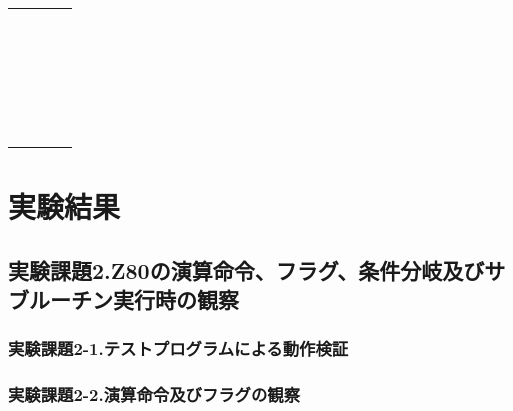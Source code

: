 \documentclass[11pt,a4j]{jsarticle}
\begin{document}
   \begin{table}[htb]
  \begin{center}
    \caption{}
    \begin{tabular}{|llll|} \hline
 &  &  &  \\
 &  &  &  \\
 &  &  &  \\
 &  &  &  \\
 &  &  &  \\
 &  &  &  \\
 &  &  &  \\
 &  &  &  \\
 &  &  &  \\
 &  &  &  \\
 &  &  &  \\
 &  &  &  \\
 &  &  &  \\
 &  &  &  \\
 &  &  &  \\
 &  &  &  \\
 &  &  &  \\
 &  &  &  \\
 &  &  &  \\
 &  &  &  \\
 &  &  &  \\
 &  &  &  \\
 &  &  &  \\ \hline
    \end{tabular}
    \label{}
  \end{center}
 \end{table}
   
  
  
  
 \section{実験結果}
  
  \subsection{実験課題2.Z80の演算命令、フラグ、条件分岐及びサブルーチン実行時の観察}
   \subsubsection{実験課題2-1.テストプログラムによる動作検証}
   
   
   \subsubsection{実験課題2-2.演算命令及びフラグの観察}
   
\end{document}
